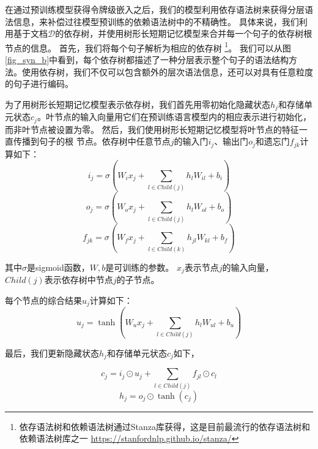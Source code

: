 \documentclass[bachelor]{thesis-uestc}
\begin{document}
在通过预训练模型获得令牌级嵌入之后，我们的模型利用依存语法树来获得分层语法信息，来补偿过往模型预训练的依赖语法树中的不精确性。
具体来说，我们利用基于文档$\mathcal{D}$的依存树，并使用树形长短期记忆模型\cite{miwa-bansal-2016-end, duan-etal-2022-just}来合并每一个句子的依存树根节点的信息。
首先，我们将每个句子解析为相应的依存树 \footnote{依存语法树和依赖语法树通过Stanza库获得，这是目前最流行的依存语法树和依赖语法树库之一 \href{https://stanfordnlp.github.io/stanza/} { https://stanfordnlp.github.io/stanza/}}。
我们可以从图\ref{fig_syn_b}中看到，每个依存树都描述了一种分层表示整个句子的语法结构方法。使用依存树，我们不仅可以包含额外的层次语法信息，还可以对具有任意粒度的句子进行编码。\par

为了用树形长短期记忆模型表示依存树，我们首先用零初始化隐藏状态$h_j$和存储单元状态$c_j$。叶节点的输入向量用它们在预训练语言模型内的相应表示进行初始化，而非叶节点被设置为零。
然后，我们使用树形长短期记忆模型\cite{miwa-bansal-2016-end}将叶节点的特征一直传播到句子的根
节点。依存树中任意节点$j$的输入门$i_j$、输出门$o_j$和遗忘门$f_{jk}$计算如下：
\begin{equation}
    i_j = \sigma(W_ix_j +\sum_{l \in Child(j)}h_{l}W_{il}+b_i) 
\end{equation}
\begin{equation}
    o_j = \sigma(W_ox_j +\sum_{l \in Child(j)}h_{l}W_{ol}+b_o) 
\end{equation}
\begin{equation}
    f_{jk} = \sigma(W_fx_j +\sum_{l \in Child(k)}h_{jl}W_{kl}+b_f)
\end{equation}

其中$\sigma$是sigmoid函数，$W, b$是可训练的参数。
$x_j$表示节点$j$的输入向量，$Child(j)$表示依存树中节点$j$的子节点。\par
每个节点的综合结果$u_j$计算如下：
\begin{equation}
    u_j = \tanh(W_ux_j +\sum_{l \in Child(j)}h_{l}W_{ul}+b_u)
\end{equation}
\par

最后，我们更新隐藏状态$h_j$和存储单元状态$c_j$如下，

\begin{equation}
    c_j = i_j \odot u_j + \sum_{l \in Child(j)} f_{jl} \odot c_l
\end{equation}
\begin{equation}
    h_j = o_j \odot \tanh(c_j)
\end{equation}
\par
\end{document}
